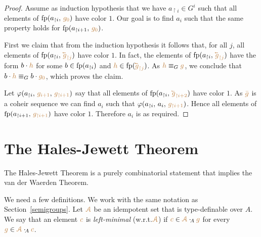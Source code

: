 \documentclass[creche.tex]{subfiles}
\begin{document}
\begin{proof}
Assume as induction hypothesis that we have $a_{\restriction i}\in G^i$ 
such that all elements of ${\rm fp}(a_{\restriction i},\,{\color{brown} g_0})$ have color $1$.
%
Our goal is to find $a_i$ 
such that the same property holds for ${\rm fp}(a_{\restriction i+1},\,{\color{brown} g_0})$.

First we claim that from the induction hypothesis it follows that, 
for all $j$, all elements of $\fp(a_{\restriction i},\,{\mr\cev{g}_{\restriction j}})$ have color $1$.
%
In fact, the elements of $\fp(a_{\restriction i},\,{\mr\cev{g}_{\restriction j}})$ 
have the form $b\cdot{\color{brown}h}$ for some $b\in{\rm fp}(a_{\restriction i})$
and ${\mr h}\in\fp({\mr\cev{g}_{\restriction j}})$.
%
As ${\color{brown} h}\equiv_G{\color{brown} g}$, we conclude that $b\cdot{\color{brown}h}\equiv_Gb\cdot {\color{brown}g_0}$, which proves the claim.

Let $\varphi(a_{\restriction i},\,{\color{brown} g_{i+1}},\,{\color{brown} g_{\restriction i+1}})$ 
say that all elements of $\fp(a_{\restriction i},\,{\mr\cev{g}_{\restriction i+2}})$ have color $1$.
%
As ${\color{brown}\bar g}$ is a coheir sequence we can find  $a_i$ 
such that $\varphi(a_{\restriction i},\,a_i,\,{\color{brown} g_{\restriction i+1}})$.
%
Hence all elements of ${\rm fp}(a_{\restriction i+1},\,{\color{brown} g_{\restriction i+1}})$ have color $1$.
%
Therefore $a_i$ is as required.
\end{proof}

\section{The Hales-Jewett Theorem}
\label{HJ}

The Hales-Jewett Theorem is a purely combinatorial statement 
that implies the van der Waerden Theorem.

We need a few definitions.
We work with the same notation as Section~\ref{semigroups}.
Let ${\color{brown}\EuScript A}$ be an idempotent set that is type-definable over $A$.
We say that an element ${\color{brown} c}$ is \emph{left-minimal\/} (w.r.t.\@ ${\color{brown}\EuScript A}$) if 
${\color{brown} c}\in{\color{brown}\EuScript A}\cdot_{\!A}{\color{brown} g}$ for every ${\color{brown} g}\in{\color{brown}\EuScript A}\cdot_{\!A}{\color{brown} c}$.
\end{document}
